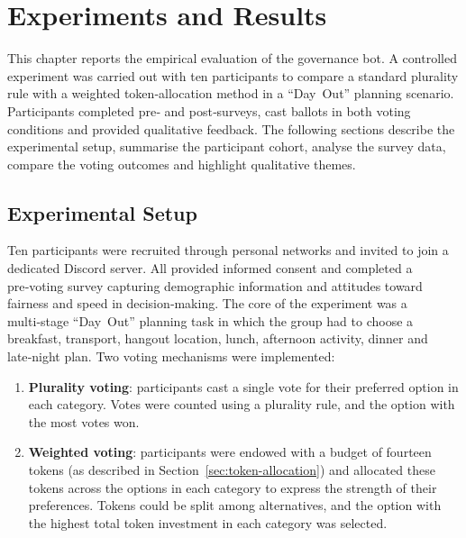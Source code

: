 \doublespacing %

\chapter{Experiments and Results}
\label{ch:experiments}

\begin{spacing}{1} %
\minitoc %
\end{spacing} %
\thesisspacing %

This chapter reports the empirical evaluation of the governance bot.  A controlled experiment was carried out with ten participants to compare a standard plurality rule with a weighted token‑allocation method in a ``Day~Out'' planning scenario.  Participants completed pre‑ and post‑surveys, cast ballots in both voting conditions and provided qualitative feedback.  The following sections describe the experimental setup, summarise the participant cohort, analyse the survey data, compare the voting outcomes and highlight qualitative themes.

\section{Experimental Setup}

Ten participants were recruited through personal networks and invited to join a dedicated Discord server.  All provided informed consent and completed a pre‑voting survey capturing demographic information and attitudes toward fairness and speed in decision‑making.  The core of the experiment was a multi‑stage ``Day~Out'' planning task in which the group had to choose a breakfast, transport, hangout location, lunch, afternoon activity, dinner and late‑night plan.  Two voting mechanisms were implemented:

\begin{enumerate}
    \item \textbf{Plurality voting}: participants cast a single vote for their preferred option in each category.  Votes were counted using a plurality rule, and the option with the most votes won.
    \item \textbf{Weighted voting}: participants were endowed with a budget of fourteen tokens (as described in Section~\ref{sec:token-allocation}) and allocated these tokens across the options in each category to express the strength of their preferences.  Tokens could be split among alternatives, and the option with the highest total token investment in each category was selected.
\end{enumerate}

